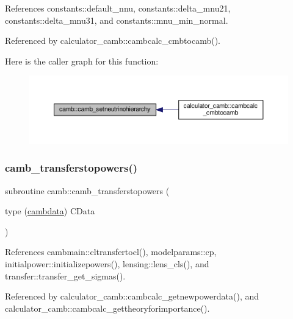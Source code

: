 References constants\+::default\+\_\+nnu, constants\+::delta\+\_\+mnu21, constants\+::delta\+\_\+mnu31, and constants\+::mnu\+\_\+min\+\_\+normal.



Referenced by calculator\+\_\+camb\+::cambcalc\+\_\+cmbtocamb().

Here is the caller graph for this function\+:
\nopagebreak
\begin{figure}[H]
\begin{center}
\leavevmode
\includegraphics[width=350pt]{namespacecamb_ad303911c183f5affcdc9665c5facdd4b_icgraph}
\end{center}
\end{figure}
\mbox{\label{namespacecamb_a9fb2095034057d44dc9526dd02d60064}} 
\subsubsection{\texorpdfstring{camb\+\_\+transferstopowers()}{camb\_transferstopowers()}}
{\footnotesize\ttfamily subroutine camb\+::camb\+\_\+transferstopowers (\begin{DoxyParamCaption}\item[{type (\mbox{\hyperlink{structcamb_1_1cambdata}{cambdata}})}]{C\+Data }\end{DoxyParamCaption})}



References cambmain\+::cltransfertocl(), modelparams\+::cp, initialpower\+::initializepowers(), lensing\+::lens\+\_\+cls(), and transfer\+::transfer\+\_\+get\+\_\+sigmas().



Referenced by calculator\+\_\+camb\+::cambcalc\+\_\+getnewpowerdata(), and calculator\+\_\+camb\+::cambcalc\+\_\+gettheoryforimportance().

